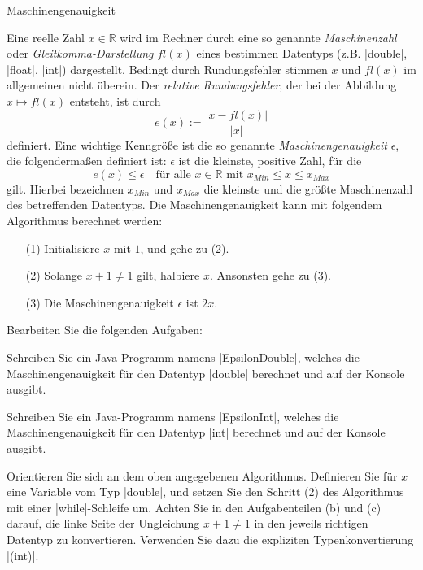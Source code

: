 \begin{exercise}{Maschinengenauigkeit}






\begin{body}
Eine reelle Zahl $x \in \mathbb{R}$ wird im Rechner durch eine so genannte \emph{Maschinenzahl} oder \emph{Gleitkomma-Darstellung} $fl(x)$ eines bestimmen Datentyps (z.B. \code|double|, \code|float|, \code|int|) dargestellt. Bedingt durch Rundungsfehler stimmen $x$ und $fl(x)$ im allgemeinen nicht überein. Der \emph{relative Rundungsfehler}, der bei der Abbildung 
$x \mapsto fl(x)$ entsteht, ist durch
\[ e(x) := \frac{\lvert x - fl(x) \rvert }{\lvert x \rvert}  \]
definiert. Eine wichtige Kenngröße ist die so genannte \emph{Maschinengenauigkeit} $\epsilon$, die folgendermaßen definiert ist: $\epsilon$ ist die kleinste, positive Zahl, für die
\[ e(x) \leq \epsilon \quad\text{für alle } x \in \mathbb{R} \text{ mit } x_{Min} \leq x \leq x_{Max} \]
gilt. Hierbei bezeichnen $x_{Min}$ und $x_{Max}$ die kleinste und die größte Maschinenzahl des betreffenden Datentyps. Die Maschinengenauigkeit kann mit folgendem Algorithmus berechnet werden:
\begin{center}
\begin{minipage}{0.8\textwidth}
\begin{enumerate}
\item[(1)] Initialisiere $x$ mit $1$, und gehe zu (2).
\item[(2)] Solange $x + 1 \neq 1$ gilt, halbiere $x$. Ansonsten gehe zu (3).
\item[(3)] Die Maschinengenauigkeit $\epsilon$ ist $2x$.
\end{enumerate}
\end{minipage}
\end{center}
\bigskip
Bearbeiten Sie die folgenden Aufgaben:
\begin{parts}
\item
Schreiben Sie ein Java-Programm namens \code|EpsilonDouble|, welches die Maschinengenauigkeit für den Datentyp \code|double| berechnet und auf der Konsole ausgibt.

\item
Schreiben Sie ein Java-Programm namens \code|EpsilonInt|, welches die Maschinengenauigkeit für den Datentyp 
\code|int| berechnet und auf der Konsole ausgibt.
\end{parts}
Orientieren Sie sich an dem oben angegebenen Algorithmus. Definieren Sie für $x$ eine Variable vom Typ \code|double|,
und setzen Sie den Schritt (2) des Algorithmus mit einer \code|while|-Schleife um. Achten Sie in den Aufgabenteilen (b) und (c) darauf, die linke Seite der Ungleichung ${x + 1} \neq 1$ in den jeweils richtigen Datentyp zu konvertieren. Verwenden Sie dazu die expliziten Typenkonvertierung \code|(int)|.
\end{body}


\end{exercise}
